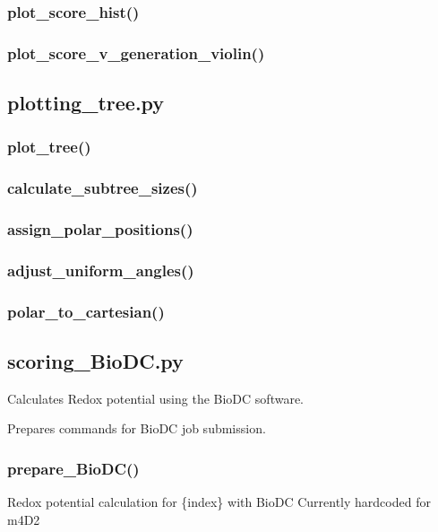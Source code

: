 \documentclass[10pt]{extarticle}
\begin{document}
\subsubsection{plot\_score\_hist()}
\subsubsection{plot\_score\_v\_generation\_violin()}
\subsection{plotting\_tree.py}
\subsubsection{plot\_tree()}
\subsubsection{calculate\_subtree\_sizes()}
\subsubsection{assign\_polar\_positions()}
\subsubsection{adjust\_uniform\_angles()}
\subsubsection{polar\_to\_cartesian()}
\subsection{scoring\_BioDC.py}
Calculates Redox potential using the BioDC software.

\par\vspace*{0.5\baselineskip}
{
\begin{description}[noitemsep,topsep=0pt,parsep=0pt,labelwidth=5cm,leftmargin=!,labelindent=0pt,labelsep=0.2cm,itemsep=0pt]
\item[\textcolor{mpgAccentBlue!75!white}{- prepare\_BioDC\dotfill}] Prepares commands for BioDC job submission.
\end{description}
}
\subsubsection{prepare\_BioDC()}
Redox potential calculation for \{index\} with BioDC
Currently hardcoded for m4D2
\end{document}
